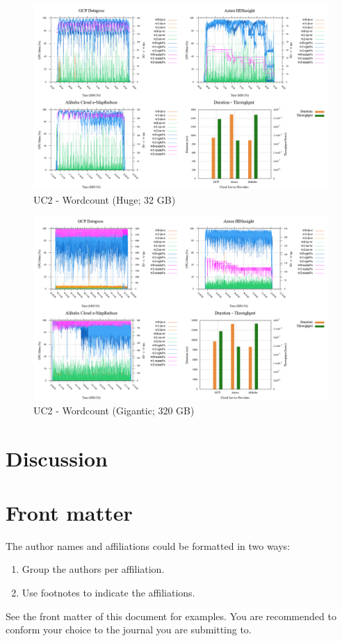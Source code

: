 \documentclass[review]{elsarticle}
\begin{document}
\begin{figure}[b]
	\caption{UC2 - Wordcount (Huge; 32 GB)}
	\includegraphics[width=\textwidth]{uc2-wrdcnt-h-cmidt}
	\centering
\end{figure}

\begin{figure}[b]
	\caption{UC2 - Wordcount (Gigantic; 320 GB)}
	\includegraphics[width=\textwidth]{uc2-wrdcnt-g-cmidt}
	\centering
\end{figure}



\section{Discussion}

\section{Front matter}

The author names and affiliations could be formatted in two ways:
\begin{enumerate}[(1)]
\item Group the authors per affiliation.
\item Use footnotes to indicate the affiliations.
\end{enumerate}
See the front matter of this document for examples. You are recommended to conform your choice to the journal you are submitting to.
\end{document}
